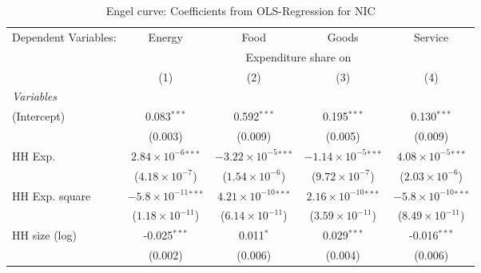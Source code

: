 
\begin{table}[htbp!]
   \centering
   \small
   \begin{adjustbox}{width = 1\textwidth, max height = 0.95\textheight, center}
      \begin{threeparttable}[b]
         \caption{\label{tab:Engel_parametric_NIC} Engel curve: Coefficients from OLS-Regression for NIC}
         \begin{tabular}{lcccc}
            \tabularnewline \midrule \midrule
            Dependent Variables: & Energy                         & Food                           & Goods                          & Service\\  
             & \multicolumn{4}{c}{Expenditure share on} \\ 
                                 & (1)                            & (2)                            & (3)                            & (4)\\  
            \midrule
            \emph{Variables}\\
            (Intercept)          & 0.083$^{***}$                  & 0.592$^{***}$                  & 0.195$^{***}$                  & 0.130$^{***}$\\   
                                 & (0.003)                        & (0.009)                        & (0.005)                        & (0.009)\\   
            HH Exp.              & $2.84\times 10^{-6}$$^{***}$   & $-3.22\times 10^{-5}$$^{***}$  & $-1.14\times 10^{-5}$$^{***}$  & $4.08\times 10^{-5}$$^{***}$\\    
                                 & ($4.18\times 10^{-7}$)         & ($1.54\times 10^{-6}$)         & ($9.72\times 10^{-7}$)         & ($2.03\times 10^{-6}$)\\    
            HH Exp. square       & $-5.8\times 10^{-11}$$^{***}$  & $4.21\times 10^{-10}$$^{***}$  & $2.16\times 10^{-10}$$^{***}$  & $-5.8\times 10^{-10}$$^{***}$\\    
                                 & ($1.18\times 10^{-11}$)        & ($6.14\times 10^{-11}$)        & ($3.59\times 10^{-11}$)        & ($8.49\times 10^{-11}$)\\    
            HH size (log)        & -0.025$^{***}$                 & 0.011$^{*}$                    & 0.029$^{***}$                  & -0.016$^{***}$\\   
                                 & (0.002)                        & (0.006)                        & (0.004)                        & (0.006)\\   

\end{tabular}
\end{threeparttable}
\end{adjustbox}
\end{table}
